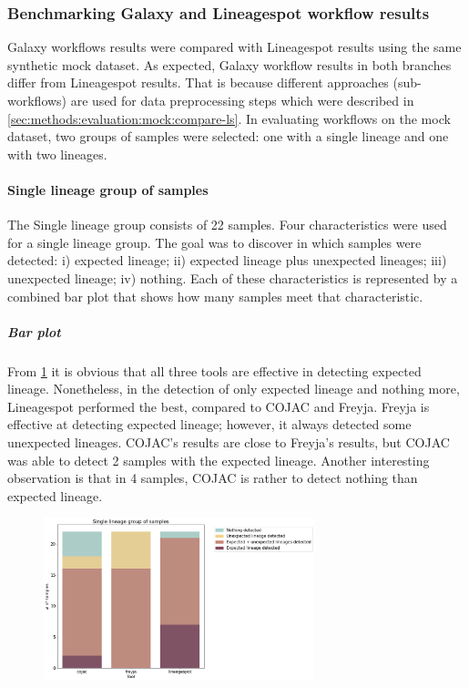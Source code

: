         \subsubsection{Benchmarking Galaxy and Lineagespot workflow results}
        Galaxy workflows results were compared with Lineagespot results using the same synthetic mock dataset. As expected, Galaxy workflow results in both branches differ from Lineagespot results. That is because different approaches (sub-workflows) are used for data preprocessing steps which were described in \cref{sec:methods:evaluation:mock:compare-ls}. In evaluating workflows on the mock dataset, two groups of samples were selected: one with a single lineage and one with two lineages.
            \paragraph{Single lineage group of samples}
            The Single lineage group consists of 22 samples. Four characteristics were used for a single lineage group. The goal was to discover in which samples were detected: i) expected lineage; ii) expected lineage plus unexpected lineages; iii) unexpected lineage; iv) nothing. Each of these characteristics is represented by a combined bar plot that shows how many samples meet that characteristic.
                \subparagraph{Bar plot}
                From \cref{fig:results:mock:bar-singlin} it is obvious that all three tools are effective in detecting expected lineage. Nonetheless, in the detection of only expected lineage and nothing more, Lineagespot performed the best, compared to COJAC and Freyja. Freyja is effective at detecting expected lineage; however, it always detected some unexpected lineages. COJAC's results are close to Freyja's results, but COJAC was able to detect 2 samples with the expected lineage. Another interesting observation is that in 4 samples, COJAC is rather to detect nothing than expected lineage. 
                \begin{figure}[ht!]
                	\centering
                    \includegraphics[width=0.7\textwidth]{figures/results/mock/singlin-num-bars.png}
                    \label{fig:results:mock:bar-singlin}
                \end{figure}
